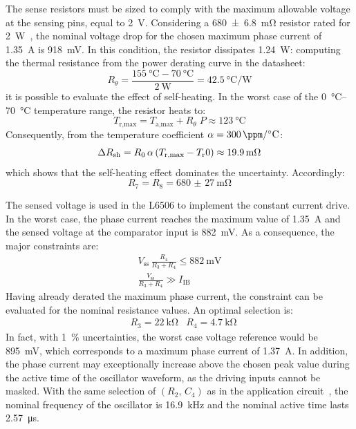 The sense resistors must be sized to comply with the maximum allowable voltage at the sensing pins, equal to \qty{2}{\V}. Considering a \qty{680(6.8)}{\mohm} resistor rated for \qty{2}{\W}~\cite{rsense}, the nominal voltage drop for the chosen maximum phase current of \qty{1.35}{\A} is \qty{918}{\mV}. In this condition, the resistor dissipates \qty{1.24}{\W}: computing the thermal resistance from the power derating curve in the datasheet:
\[
    R_\theta = \frac{\qty{155}{\celsius}-\qty{70}{\celsius}}{\qty{2}{\W}}
             = \qty{42.5}{\celsius\per\W}
\]
it is possible to evaluate the effect of self-heating. In the worst case of the \qtyrange{0}{70}{\celsius} temperature range, the resistor heats to:
\[
    T_\text{r,max} = T_{\text{a,max}} + R_\theta\;P \approx \qty{123}{\celsius}
\]
Consequently, from the temperature coefficient $\alpha = \qty{300}{\ppm\per\celsius}$:
\[
    \Delta R_\text{sh} = R_0\,\alpha\,\pqty*{T_\text{r,max} - T_\text{r}0}
    \approx \qty{19.9}{\mohm}
\]
which shows that the self-heating effect dominates the uncertainty. Accordingly:
\[
    R_7 = R_8 = \qty{680(27)}{\mohm}
\]

The sensed voltage is used in the L6506 to implement the constant current drive. In the worst case, the phase current reaches the maximum value of \qty{1.35}{\A} and the sensed voltage at the comparator input is \qty{882}{\mV}. As a consequence, the major constraints are:
\begin{gather*}
    V_\text{ss}\,\frac{R_4}{R_3+R_4} \leq \qty{882}{\mV} \\
    \frac{V_\text{ss}}{R_3+R_4} \gg I_\text{IB}
\end{gather*}
Having already derated the maximum phase current, the constraint can be evaluated for the nominal resistance values. An optimal selection is:
\begin{align*}
    &R_3 = \qty{22}{\kohm} &R_4 = \qty{4.7}{\kohm}
\end{align*}
In fact, with \qty{1}{\percent} uncertainties, the worst case voltage reference would be \qty{895}{\mV}, which corresponds to a maximum phase current of \qty{1.37}{\A}.
In addition, the phase current may exceptionally increase above the chosen peak value during the active time of the oscillator waveform, as the driving inputs cannot be masked. With the same selection of $(R_2,\,C_4)$ as in the application circuit~\cite[5]{l6506}, the nominal frequency of the oscillator is \qty{16.9}{\kHz} and the nominal active time lasts \qty{2.57}{\micro\s}.
